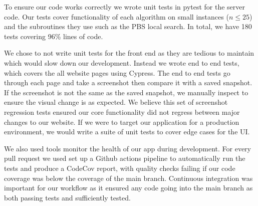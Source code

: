 To ensure our code works correctly we wrote unit tests in pytest for the server code. Our tests cover functionality of each algorithm on small instances ($n\leq 25$) and the subroutines they use such as the PBS local search. In total, we have 180 tests covering 96\% lines of code. 

We chose to not write unit tests for the front end as they are tedious to maintain which would slow down our development. Instead we wrote end to end tests, which covers the all website pages using Cypress. The end to end tests go through each page and take a screenshot then compare it with a saved snapshot. If the screenshot is not the same as the saved snapshot, we manually inspect to ensure the visual change is as expected. We believe this set of screenshot regression tests ensured our core functionality did not regress between major changes to our website. If we were to target our application for a production environment, we would write a suite of unit tests to cover edge cases for the UI.

We also used tools monitor the health of our app during development. For every pull request we used set up a Github actions pipeline to automatically run the tests and produce a CodeCov report, with quality checks failing if our code coverage was below the coverage of the main branch. Continuous integration was important for our workflow as it ensured any code going into the main branch as both passing tests and sufficiently tested.